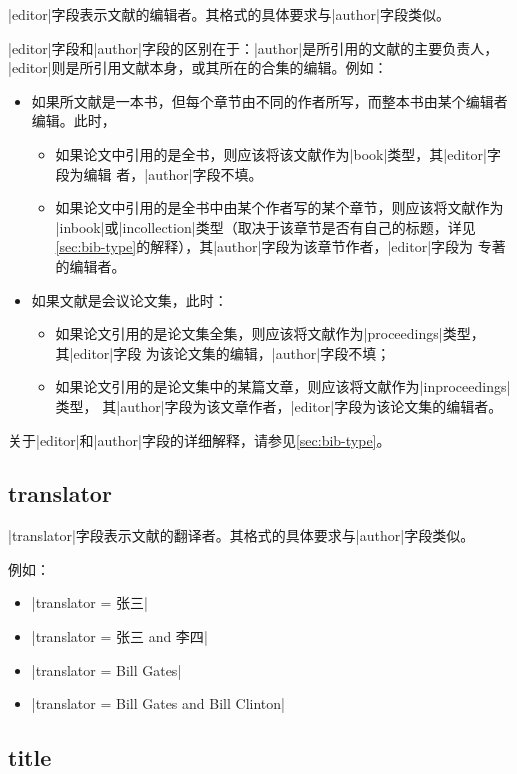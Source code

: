 |editor|字段表示文献的编辑者。其格式的具体要求与|author|字段类似。

|editor|字段和|author|字段的区别在于：|author|是所引用的文献的主要负责人，
|editor|则是所引用文献本身，或其所在的合集的编辑。例如：
\begin{itemize}
\item 如果所文献是一本书，但每个章节由不同的作者所写，而整本书由某个编辑者编辑。此时，
  \begin{itemize}
  \item 如果论文中引用的是全书，则应该将该文献作为|book|类型，其|editor|字段为编辑
    者，|author|字段不填。
  \item 如果论文中引用的是全书中由某个作者写的某个章节，则应该将文献作为
    |inbook|或|incollection|类型（取决于该章节是否有自己的标题，详见
    \ref{sec:bib-type}的解释），其|author|字段为该章节作者，|editor|字段为
    专著的编辑者。
  \end{itemize}
\item 如果文献是会议论文集，此时：
  \begin{itemize}
  \item 如果论文引用的是论文集全集，则应该将文献作为|proceedings|类型，其|editor|字段
    为该论文集的编辑，|author|字段不填；
  \item 如果论文引用的是论文集中的某篇文章，则应该将文献作为|inproceedings|类型，
    其|author|字段为该文章作者，|editor|字段为该论文集的编辑者。
  \end{itemize}
\end{itemize}

关于|editor|和|author|字段的详细解释，请参见\ref{sec:bib-type}。

\subsection{translator}\label{subsec:bibfield-translator}

|translator|字段表示文献的翻译者。其格式的具体要求与|author|字段类似。

例如：
\begin{itemize}
\item |translator = {张三}|
\item |translator = {张三 and 李四}|
\item |translator = {Bill Gates}|
\item |translator = {Bill Gates and Bill Clinton}|
\end{itemize}

\subsection{title}\label{subsec:bibfield-title}

